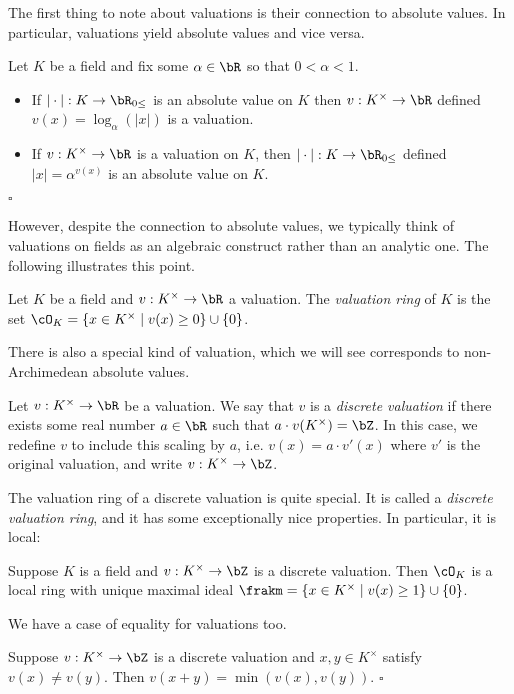 The first thing to note about valuations is their connection to absolute values. In particular, valuations yield absolute values and vice versa.
\begin{prop}\label{prop:val-to-absval}
	Let $K$ be a field and fix some $\alpha \in \bR$ so that $0 < \alpha < 1$. 
	\begin{itemize}
		\item If $|\cdot|:K\to \bR_{0\leq}$ is an absolute value on $K$ then $v:K^\times \to \bR$ defined $v(x) = \log_{\alpha}(|x|)$ is a valuation. 
		\item If $v:K^\times \to \bR$ is a valuation on $K$, then $|\cdot|:K\to \bR_{0\leq}$ defined $|x| = \alpha^{v(x)}$ is an absolute value on $K$. 
	\end{itemize}
\hfill $\square$
\end{prop}
However, despite the connection to absolute values, we typically think of valuations on fields as an algebraic construct rather than an analytic one. The following illustrates this point.
\begin{prop}\label{prop:val-ring}
	Let $K$ be a field and $v:K^\times \to \bR$ a valuation. The \emph{valuation ring} of $K$ is the set $\cO_K = \{x \in K^\times \mid v(x) \geq 0\} \cup \{0\}$.
\end{prop}

There is also a special kind of valuation, which we will see corresponds to non-Archimedean absolute values. 
\begin{defn}\label{defn:discrete-valuation}
	Let $v:K^\times \to \bR$ be a valuation. We say that $v$ is a \emph{discrete valuation} if there exists some real number $a \in \bR$ such that $a \cdot v(K^\times) = \bZ$. In this case, we redefine $v$ to include this scaling by $a$, i.e. $v(x) = a\cdot v'(x)$ where $v'$ is the original valuation, and write $v:K^\times \to \bZ$.
\end{defn}
The valuation ring of a discrete valuation is quite special. It is called a \emph{discrete valuation ring}, and it has some exceptionally nice properties. In particular, it is local:
\begin{prop}\label{prop:disc-val-ring-max}
	Suppose $K$ is a field and $v:K^\times \to \bZ$ is a discrete valuation. Then $\cO_K$ is a local ring with unique maximal ideal $\frakm = \{x \in K^\times \mid v(x) \geq 1\} \cup \{0\}$.
\end{prop}

\noindent We have a case of equality for valuations too.
\begin{prop}\label{prop:case-of-equality-val}
	Suppose $v:K^\times \to \bZ$ is a discrete valuation and $x,y \in K^\times$ satisfy $v(x) \neq v(y)$. Then $v(x+y) = \min(v(x),v(y))$. \hfill $\square$
\end{prop}

